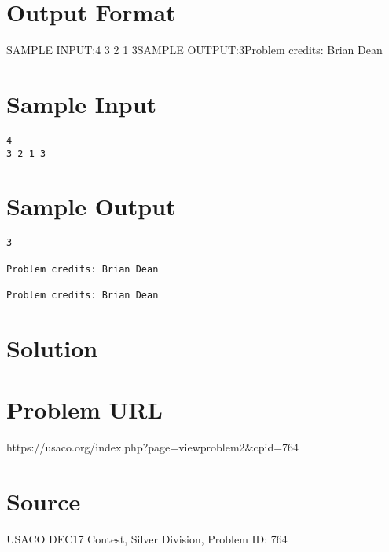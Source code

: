 \documentclass[12pt]{article}
\begin{document}
\section*{Output Format}
SAMPLE INPUT:4
3 2 1 3SAMPLE OUTPUT:3Problem credits: Brian Dean

\section*{Sample Input}
\begin{verbatim}
4
3 2 1 3
\end{verbatim}

\section*{Sample Output}
\begin{verbatim}
3

Problem credits: Brian Dean

Problem credits: Brian Dean
\end{verbatim}

\section*{Solution}


\section*{Problem URL}
https://usaco.org/index.php?page=viewproblem2&cpid=764

\section*{Source}
USACO DEC17 Contest, Silver Division, Problem ID: 764
\end{document}
